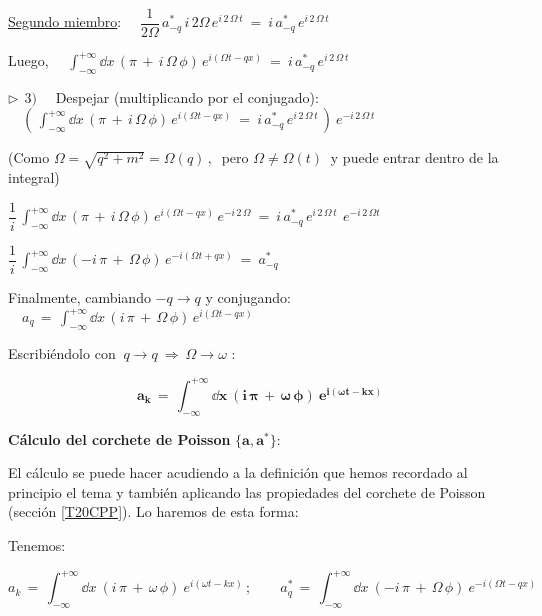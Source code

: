 \underline{Segundo miembro}: $\quad \displaystyle \dfrac 1{2\Omega} \, a^*_{-q}\, i \, 2\Omega\, e^{i\, 2\, \Omega \, t} \ = \ i\, a^*_{-q}\, e^{i\, 2\, \Omega \, t}$

Luego, $\quad \displaystyle  \int_{-\infty}^{+\infty} \dd x \, (\pi\, + \, i\, \Omega\, \phi) \,  e^{i(\Omega t-qx)}  \ = \ i\, a^*_{-q}\, e^{i\, 2\, \Omega \, t} $


\vspace{5mm} $\triangleright \ \ 3) \quad $ Despejar (multiplicando por el conjugado): $\quad \left(\, \int_{-\infty}^{+\infty} \dd x \, (\pi\, + \, i\, \Omega\, \phi) \,  e^{i(\Omega t-qx)}  \ = \ i\, a^*_{-q}\, e^{i\, 2\, \Omega \, t}  \, \right) \ e^{-i\, 2\, \Omega \, t}$

\begin{small}\textcolor{gris}{(Como $\Omega=\sqrt{q^2+m^2}=\Omega(q)\, , \ $  pero $\Omega \neq \Omega(t)\ $ y puede entrar dentro de la integral)}\end{small}

$\displaystyle \dfrac 1 i \,  \int_{-\infty}^{+\infty} \dd x \, (\pi\, + \, i\, \Omega\, \phi) \,  e^{i(\Omega t-qx)} \, e^{-i\, 2\, \Omega}  \ = \ i\, a^*_{-q}\, e^{i\, 2\, \Omega \, t} \, \ e^{-i\, 2\, \Omega t}$

$\displaystyle \dfrac 1 i \,  \int_{-\infty}^{+\infty} \dd x \, (-i\, \pi\, + \, \Omega\, \phi) \,  e^{-i(\Omega t+qx)}   \ = \  a^*_{-q}$

Finalmente, cambiando $-q\to q$ y conjugando: $\quad \displaystyle a_q\, = \,  \int_{-\infty}^{+\infty} \dd x \, (i\, \pi\, + \, \Omega\, \phi) \,  e^{i(\Omega t-qx)}$

Escribiéndolo con $\ q \to q  \ \Rightarrow \ \Omega \to \omega $ :

\begin{equation}
\label{T41coefte}
\boldsymbol{
a_k\, = \,  \int_{-\infty}^{+\infty} \dd x \ (i\, \pi\, + \, \omega\, \phi) \  e^{i(\omega t-kx)}
}	
\end{equation}


\vspace{10mm} \textbf{Cálculo del corchete de Poisson } $\boldsymbol{\{a,a^* \}} $:


El cálculo se puede hacer acudiendo a la definición que hemos recordado al principio el tema y también aplicando las propiedades del corchete de Poisson
(sección \ref{T20CPP}). Lo haremos de esta forma:

Tenemos:  

\begin{equation}
\label{T41a-a*}
a_k\, = \,  \int_{-\infty}^{+\infty} \dd x \ (i\, \pi\, + \, \omega\, \phi) \  e^{i(\omega t-kx)} \, ; \qquad 
a^*_q\, = \,  \int_{-\infty}^{+\infty} \dd x \ (-i\, \pi\, + \, \Omega\, \phi) \  e^{-i(\Omega t-qx)} 
\end{equation}

